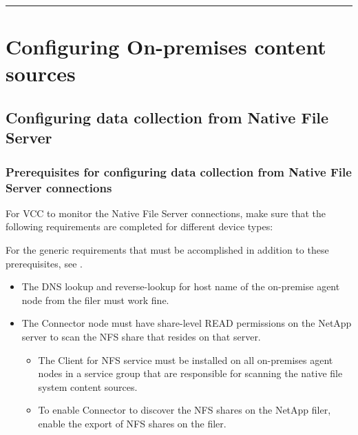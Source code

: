 \documentclass[letterpaper,10pt,english]{sphinxmanual}
\begin{document}
\bigskip\hrule\bigskip



\section{Configuring On-premises content sources}
\label{\detokenize{mcdmp_app_ug:configuring-on-premises-content-sources}}

\subsection{Configuring data collection from Native File Server}
\label{\detokenize{mcdmp_app_ug:configuring-data-collection-from-native-file-server}}

\subsubsection{Prerequisites for configuring data collection from Native File Server connections}
\label{\detokenize{mcdmp_app_ug:prereq-nfs}}\label{\detokenize{mcdmp_app_ug:prerequisites-for-configuring-data-collection-from-native-file-server-connections}}
For VCC to monitor the Native File Server connections, make sure that the following requirements are completed for different device types:

For the generic requirements that must be accomplished in addition to these prerequisites, see {\hyperref[\detokenize{mcdmp_app_ug:requirements-generic}]{}}.

\begin{itemize}
\item {} 
The DNS lookup and reverse-lookup for host name of the on-premise agent node from the filer must work fine.

\item {} 
The Connector node must have share-level READ permissions on the NetApp server to scan the NFS share that resides on that server.
\begin{itemize}
\item {} 
The Client for NFS service must be installed on all on-premises agent nodes in a service group that are responsible for scanning the native file system content sources.

\item {} 
To enable Connector to discover the NFS shares on the NetApp filer, enable the export of NFS shares on the filer.

\end{itemize}

\end{itemize}
\end{document}
